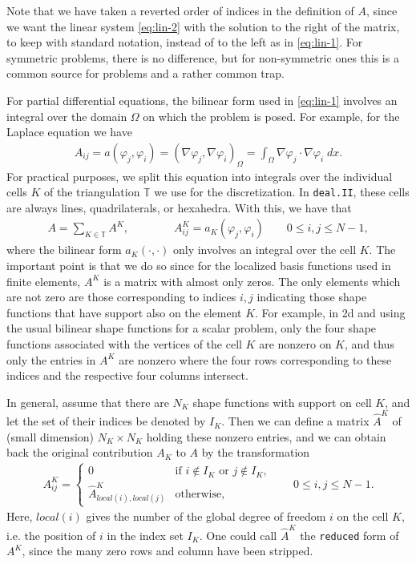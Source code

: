 \documentclass{article}
\begin{document}
Note that we have taken a reverted order of indices in the definition of $A$,
since we want the linear system \eqref{eq:lin-2} with the solution to the
right of the matrix, to keep with standard notation, instead of to the left as
in \eqref{eq:lin-1}. For symmetric problems, there is no difference, but for
non-symmetric ones this is a common source for problems and a rather common
trap. 

For partial differential equations, the bilinear form used in \eqref{eq:lin-1}
involves an integral over the domain $\Omega$ on which the problem is
posed. For example, for the Laplace equation we have
\begin{gather*}
  A_{ij}
  =
  a(\varphi_j, \varphi_i)
  =
  (\nabla \varphi_j, \nabla \varphi_i)_\Omega
  =
  \int_\Omega \nabla \varphi_j \cdot \nabla \varphi_i \; dx.
\end{gather*}
For practical purposes, we split this equation into integrals over the
individual cells $K$ of the triangulation $\mathbb T$ we use for the
discretization. In \texttt{deal.II}, these cells are always lines,
quadrilaterals, or hexahedra. With this, we have that
\begin{gather*}
  A = \sum_{K \in {\mathbb T}} A^K,
  \qquad\qquad
  A^K_{ij} = a_K(\varphi_j, \varphi_i) 
  \qquad
  0\le i,j\le N-1,
\end{gather*}
where the bilinear form $a_K(\cdot,\cdot)$ only involves an integral over the
cell $K$. The important point is that we do so since for the localized basis
functions used in finite elements, $A^K$ is a matrix with almost only zeros.
The only elements which are not zero are those corresponding to indices $i,j$
indicating those shape functions that have support also on the element $K$.
For example, in 2d and using the usual bilinear shape functions for a scalar
problem, only the four shape functions associated with the vertices of the
cell $K$ are nonzero on $K$, and thus only the entries in $A^K$ are nonzero
where the four rows corresponding to these indices and the respective four
columns intersect.

In general, assume that there are $N_K$ shape functions with support on cell
$K$, and let the set of their indices be denoted by $I_K$. Then we can define
a matrix $\hat A^K$ of (small dimension) $N_K\times N_K$ holding these nonzero
entries, and we can obtain back the original contribution $A_K$ to $A$ by the
transformation
\begin{gather*}
  A^K_{ij} = 
  \left\{
    \begin{array}{ll}
      0 & \text{if $i\not\in I_K$ or $j\not\in I_K$,} \\
      \hat A^K_{local(i),local(j)} & \text{otherwise},
    \end{array}
  \right.
  \qquad 0\le i,j\le N-1.
\end{gather*}
Here, $local(i)$ gives the number of the global degree of freedom $i$ on the
cell $K$, i.e. the position of $i$ in the index set $I_K$. One could call
$\hat A^K$ the \texttt{reduced} form of $A^K$, since the many zero rows and
column have been stripped.
\end{document}

